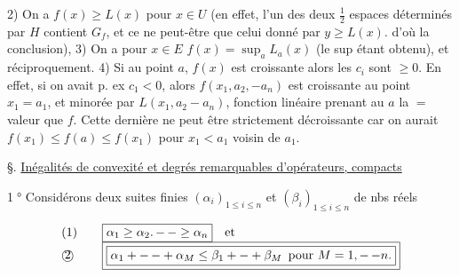 2) On a $f(x)\geq L(x)$ pour \uline{} $x\in U$ (en effet, l'un des deux  $\frac12$ espaces  déterminés par $H$ contient $G_f$, et ce ne peut-être que celui donné par $y\geq L(x)$.  d'où la conclusion), 3) On a pour $x\in E$ $f(x)=\sup_a L_a(x)$ (le sup étant obtenu), et réciproquement. 4) Si au point $a$, $f(x)$ est croissante alors les $c_i$ sont $\geq0$. En effet, si on avait p. ex $c_1<0$, alors $f(x_1,a_2,-a_n)$ est croissante au point $x_1=a_1$,
\reversemarginpar{}\normalmarginpar
et  minorée par $L(x_1,a_2-a_n)$, fonction linéaire prenant au  $a$ la $=$ valeur que $f$. Cette dernière ne peut être strictement décroissante car on aurait $f(x_1)\leq f(a)\leq f(x_1)$ pour $x_1<a_1$ voisin de $a_1$.

\reversemarginpar{}\normalmarginpar


§. \uline{Inégalités de convexité et degrés remarquables d'opérateurs, compacts}

  \textcircled{1°}   Considérons deux suites finies
$(\alpha_i)_{1\leq i\leq n}$ et $(\beta_i)_{1\leq i\leq n}$ de nbs réels  

{\reversemarginpar{}}
\[
\begin{array}{@{}l@{\qquad}l@{}}
(1)&\displaystyle\boxed{\alpha_1\geq\alpha_2\mathord{.}\,\mathord{-}\,\mathord{-}\geq\alpha_n}\quad\text{et}\\
\text{\textcircled{2}}&\displaystyle\boxed{\boxed{\alpha_1+\mathord{-}\,\mathord{-}+\alpha_M\leq\beta_1+\mathord{-}+\beta_M\enspace\text{pour }M=1,\mathord{-}\,\mathord{-}n.}}
\end{array}
\]

